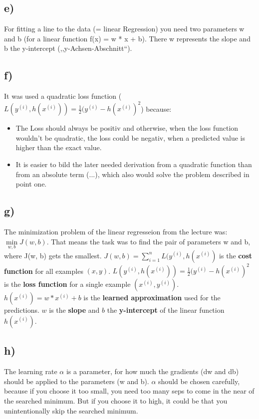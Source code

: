 \documentclass[a4paper]{article}
\begin{document}
\subsection*{e)}
For fitting a line to the data (= linear Regression) you need two parameters w and b (for a linear function f(x) = w * x + b). There w represents the slope and b the y-intercept (,,y-Achsen-Abschnitt``).

\subsection*{f)}
It was used a quadratic loss function ($L(y^{(i)}, h(x^{(i)})) = \frac{1}{2}(y^{(i)}-h(x^{(i)})^2$) because:
\begin{itemize}
    \item The Loss should always be positiv and otherwise, when the loss function wouldn't be quadratic, the loss could be negativ, when a predicted value is higher than the exact value. 
    \item It is easier to bild the later needed derivation from a quadratic function than from an absolute term (\textbar...\textbar), which also would solve the problem described in point one.
\end{itemize}
\newpage
\subsection*{g)}
The minimization problem of the linear regresseion from the lecture was: $\min\limits_{w, b} J(w, b)$. That means the task was to find the pair of parameters w and b, where J(w, b) gets the smallest. \newline
\newline
$J(w, b) = \sum_{i=1}^{n} L(y^{(i)}, h(x^{(i)})$ is the \textbf{cost function} for all examples $(x, y)$. \newline \newline
$L(y^{(i)}, h(x^{(i)})) = \frac{1}{2}(y^{(i)}-h(x^{(i)})^2$ is the \textbf{loss function} for a single example $(x^{(i)}, y^{(i)})$. \newline \newline
$h(x^{(i)}) = w * x^{(i)} + b $ is the \textbf{learned approximation} used for the predictions. 
\newline \newline
$w$ is the \textbf{slope} and $b$ the \textbf{y-intercept} of the linear function $h(x^{(i)})$.

\subsection*{h)}
The learning rate $\alpha$ is a parameter, for how much the gradients (dw and db) should be applied to the parameters (w and b). \newline
$\alpha$ should be chosen carefully, because if you choose it too small, you need too many seps to come in the near of the searched minimum. But if you choose it to high, it could be that you unintentionally skip the searched minimum.
\end{document}
